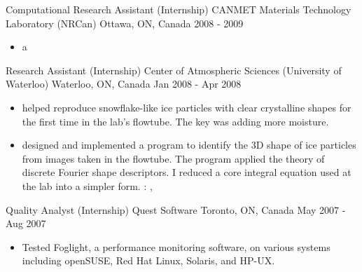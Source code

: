 \cventry
  {Computational Research Assistant (Internship)} %
  {CANMET Materials Technology Laboratory (NRCan)} %
  {Ottawa, ON, Canada} %
  {2008 - 2009} %
  {
    \begin{itemize} %
      \liststyle
      \item {a}
    \end{itemize}
  }
\mynotes{
}



\cventry
  {Research Assistant (Internship)} %
  {Center of Atmospheric Sciences (University of Waterloo)} %
  {Waterloo, ON, Canada} %
  {Jan 2008 - Apr 2008} %
  {
    \begin{itemize} %
      \liststyle
      \item {helped reproduce snowflake-like ice particles with clear crystalline shapes for the first time in the lab's flowtube. The key was adding more moisture.}
      \item { designed and implemented a program to identify the 3D shape of ice particles from images taken in the flowtube. 
      The program applied the theory of discrete Fourier shape descriptors. 
      I reduced a core integral equation used at the lab into a simpler form.
      \tgskills: \rfcpp, \rfmysql}
    \end{itemize}
  }

\cventry
  {Quality Analyst (Internship)} %
  {Quest Software} %
  {Toronto, ON, Canada} %
  {May 2007 - Aug 2007} %
  {
    \begin{itemize} %
      \liststyle
      \item {Tested Foglight, a performance monitoring software, on various systems including openSUSE, Red Hat Linux, Solaris, and HP-UX.}
    \end{itemize}
  }

